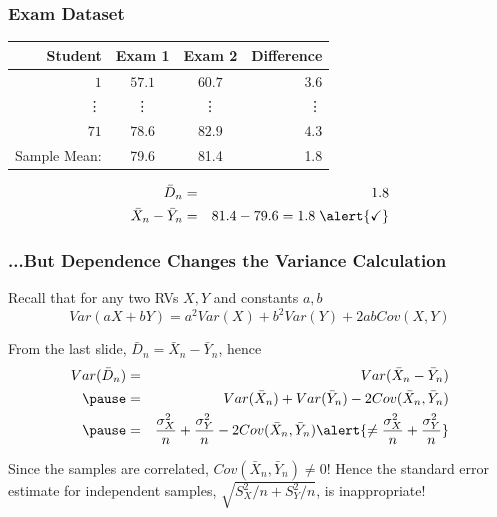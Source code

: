 \documentclass[handout]{beamer}
\begin{document}
\begin{frame}
\frametitle{Exam Dataset}
%
\begin{table}[!tbp]
\begin{center}
\begin{tabular}{rccr}
\hline\hline
\multicolumn{1}{r}{Student}&\multicolumn{1}{c}{Exam 1}&\multicolumn{1}{c}{Exam 2}&\multicolumn{1}{r}{Difference}\tabularnewline
\hline
$ 1$&$57.1$&$60.7$&$  3.6$\tabularnewline
\vdots&\vdots&\vdots&\vdots\\
$71$&$78.6$&$82.9$&$  4.3$\tabularnewline
\hline
Sample Mean: & 79.6 & 81.4  &1.8\\
\hline
\end{tabular}
\end{center}
\end{table}


\begin{eqnarray*}
	\bar{D}_n &=& 1.8\\ 
	\bar{X}_n - \bar{Y}_n &=&  81.4 - 79.6 =   1.8  \;\alert{\checkmark}
\end{eqnarray*}

\end{frame}


\begin{frame}
\frametitle{...But Dependence Changes the Variance Calculation}
\small
Recall that for any two RVs $X,Y$ and constants $a,b$
$$Var(aX + bY) = a^2 Var(X) + b^2Var(Y) + 2ab Cov(X,Y)$$

\pause
From the last slide, $\bar{D}_n = \bar{X}_n - \bar{Y}_n$, hence
\begin{eqnarray*}
Var(\bar{D}_n) &=& Var(\bar{X}_n - \bar{Y}_n)\\ \pause
 &=& Var(\bar{X}_n) + Var(\bar{Y}_n) - 2Cov(\bar{X}_n, \bar{Y}_n)\\ \pause
	&=& \frac{\sigma_X^2}{n} + \frac{\sigma_Y^2}{n} - 2Cov(\bar{X}_n, \bar{Y}_n) \alert{\neq \frac{\sigma_X^2}{n} + \frac{\sigma_Y^2}{n}}\\
\end{eqnarray*}


\alert{Since the samples are correlated, $Cov(\bar{X}_n, \bar{Y}_n)\neq 0$! Hence the standard error estimate for independent samples, $\sqrt{S^2_X/n + S^2_Y/n}$, is  inappropriate!}


\end{frame}
\end{document}

